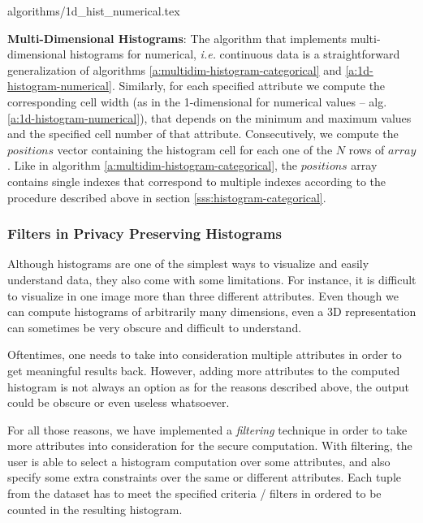 {algorithms/1d_hist_numerical.tex}



\textbf{Multi-Dimensional Histograms}:
The algorithm that implements multi\hyp dimensional histograms for numerical, \textit{i.e.} continuous data is a straightforward generalization of algorithms \ref{a:multidim-histogram-categorical} and \ref{a:1d-histogram-numerical}.
Similarly, for each specified attribute we compute the corresponding cell width (as in the 1\hyp dimensional for numerical values -- alg. \ref{a:1d-histogram-numerical}), that depends on the minimum and maximum values and the specified cell number of that attribute.
Consecutively, we compute the $positions$ vector containing the histogram cell for each one of the $N$ rows of $array$.
Like in algorithm \ref{a:multidim-histogram-categorical}, the $positions$ array contains single indexes that correspond to multiple indexes according to the procedure described above in section \ref{sss:histogram-categorical}.





\subsubsection{Filters in Privacy Preserving Histograms}\label{sss:histogram-filters}
Although histograms are one of the simplest ways to visualize and easily understand data, they also come with some limitations.
For instance, it is difficult to visualize in one image more than three different attributes.
Even though we can compute histograms of arbitrarily many dimensions, even a 3D representation can sometimes  be very obscure and difficult to understand.

Oftentimes, one needs to take into consideration multiple attributes in order to get meaningful results back.
However, adding more attributes to the computed histogram is not always an option as for the reasons described above, the output could be obscure or even useless whatsoever.

For all those reasons, we have implemented a \textit{filtering} technique in order to take more attributes into consideration for the secure computation.
With filtering, the user is able to select a histogram computation over some attributes, and also specify some extra constraints over the same or different attributes.
Each tuple from the dataset has to meet the specified criteria / filters in ordered to be counted in the resulting histogram.

